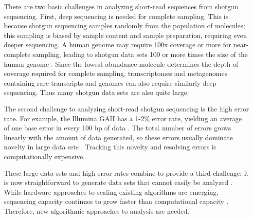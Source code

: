 \documentclass{pnastwo}
\begin{document}
\begin{article}
There are two basic challenges in analyzing short-read sequences from
shotgun sequencing. First, deep sequencing is needed for complete
sampling. This is because shotgun sequencing samples randomly from the
population of molecules; this sampling is biased by sample content and
sample preparation, requiring even deeper sequencing. A human genome
may require 100x coverage or more for near-complete sampling, leading
to shotgun data sets 100 or more times the size of the human genome
\cite{pubmed21187386}.  Since the lowest abundance molecule determines
the depth of coverage required for complete sampling, transcriptomes
and metagenomes containing rare transcripts and genomes can also
require similarly deep sequencing.  Thus many shotgun data sets are
also quite large.

The second challenge to analyzing short-read shotgun sequencing is the
high error rate.  For example, the Illumina GAII has a 1-2\% error
rate, yielding an average of one base error in every 100 bp of data
\cite{pubmed19997069}.  The total number of errors grows linearly with
the amount of data generated, so these errors usually dominate
novelty in large data sets \cite{pubmed21245053}.  Tracking this
novelty and resolving errors is computationally expensive.

These large data sets and high error rates combine to provide a third
challenge: it is now straightforward to generate data sets that cannot
easily be analyzed \cite{pubmed21867570}.  While hardware approaches
to scaling existing algorithms are emerging, sequencing capacity
continues to grow faster than computational capacity
\cite{pubmed20441614}.  Therefore, new algorithmic approaches to
analysis are needed.


\end{article}
\end{document}
